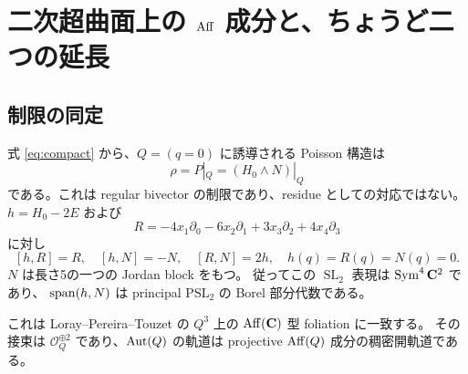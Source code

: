 \documentclass[11pt,a4paper]{ltjsarticle}
\newcommand{\OO}{\mathcal O}\newcommand{\FF}{\mathcal F}\newcommand{\cP}{\mathcal P}\newcommand{\dd}{\mathrm d}
\DeclareMathOperator{\SL}{SL}\DeclareMathOperator{\Sp}{Sp}\DeclareMathOperator{\SO}{SO}
\DeclareMathOperator{\Sym}{Sym}
\theoremstyle{remark}\newtheorem{remark}[theorem]{注意}\renewcommand{\proofname}{証明}
\begin{document}
\section{二次超曲面上の \texorpdfstring{$\operatorname{Aff}$}{Aff} 成分と、ちょうど二つの延長}\label{sec:extension}
\subsection{制限の同定}
式 \eqref{eq:compact} から、$Q=(q=0)$ に誘導される Poisson 構造は
\[
 \rho=P|_Q=(H_0\wedge N)|_Q
\]
である。これは regular bivector の制限であり、residue としての対応ではない。
$h=H_0-2E$ および
\[
 R=-4x_1\partial_0-6x_2\partial_1+3x_3\partial_2+4x_4\partial_3
\]
に対し
\[
 [h,R]=R,\quad [h,N]=-N,\quad [R,N]=2h,\quad
 h(q)=R(q)=N(q)=0.
\]
$N$ は長さ5の一つの Jordan block をもつ。
従ってこの $\SL_2$ 表現は $\Sym^4\CC^2$ であり、
$\operatorname{span}(h,N)$ は principal $\mathrm{PSL}_2$ の Borel 部分代数である。

これは Loray--Pereira--Touzet \cite[Example 5.1, Theorem 5.2]{LPT} の
$Q^3$ 上の $\operatorname{Aff}(\mathbf C)$ 型 foliation に一致する。
その接束は $\OO_Q^{\oplus2}$ であり、$\operatorname{Aut}(Q)$ の軌道は projective $\operatorname{Aff}(Q)$ 成分の稠密開軌道である。
\end{document}
